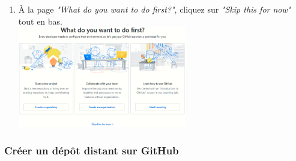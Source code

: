 \documentclass{article}
\begin{document}
\begin{enumerate}
  \pagebreak      
  \item À la page \textit{"What do you want to do first?"}, cliquez sur \textit{"Skip this for now"} tout en bas.\\
  \includegraphics[width=0.58\textwidth, center]{After_Signup}
  
\end{enumerate}

\subsubsection{Créer un dépôt distant sur GitHub}
\end{document}
